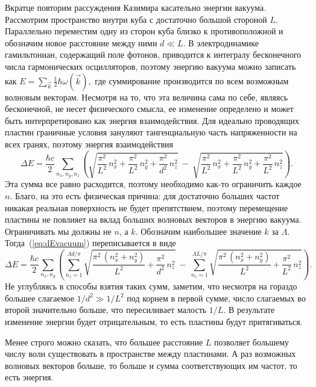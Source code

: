 Вкратце повторим рассуждения Казимира касательно энергии вакуума. Рассмотрим пространство внутри куба с достаточно большой стороной $L$. Параллельно переместим одну из сторон куба близко к противоположной и обозначим новое расстояние между ними $d\ll L$. 
В электродинамике гамильтониан, содержащий поле фотонов, приводится к интегралу бесконечного числа гармонических осцилляторов, поэтому энергию вакуума можно записать как 
$E = \sum\limits_\vec{k} \frac{1}{2} \hbar\omega(\vec{k}),$
где суммирование производится по всем возможным волновым векторам. Несмотря на то, что эта величина сама по себе, являясь бесконечной, не несет физического смысла, ее изменение определено и может быть интерпретировано как энергия взаимодействия. Для идеально проводящих пластин граничные условия зануляют тангенциальную часть напряженности на всех гранях, поэтому энергия взаимодействия
\begin{equation}
\Delta E = \frac{\hbar c}{2}\sum\limits_{n_x, n_y, n_z} \left(
\sqrt{\frac{\pi^2}{L^2}\,n_x^2 + \frac{\pi^2}{L^2}\,n_y^2 + \frac{\pi^2}{d^2}\,n_z^2} \ - \ 
\sqrt{\frac{\pi^2}{L^2}\,n_x^2 + \frac{\pi^2}{L^2}\,n_y^2 + \frac{\pi^2}{L^2}\,n_z^2}
\right).
\label{eq:dEvacuum}
\end{equation}
Эта сумма все равно расходится, поэтому необходимо как-то ограничить каждое~$n$. Благо, на это есть физическая причина: для достаточно больших частот никакая реальная поверхность не будет препятствием, поэтому перемещение пластины не повлияет на вклад больших волновых векторов в энергию вакуума. Ограничивать мы должны не $n$, а $k$. Обозначим наибольшее значение $k$ за $\Lambda$. Тогда~(\ref{eq:dEvacuum}) переписывается в виде 
\begin{equation}
\Delta E = \frac{\hbar c}{2}\sum\limits_{n_x, n_y}\left(
\sum\limits_{n_z=1}^{\Lambda d/\pi} \sqrt{\frac{\pi^2\,(n_x^2 + n_y^2)}{L^2} + \frac{\pi^2}{d^2}\,n_z^2} \ - \ 
\sum\limits_{n_z=1}^{\Lambda L/\pi} \sqrt{\frac{\pi^2\,(n_x^2 + n_y^2)}{L^2} + \frac{\pi^2}{L^2}\,n_z^2}
\right).
\label{eq:dEvac.trimmed}
\end{equation}
Не углубляясь в способы взятия таких сумм, заметим, что несмотря на гораздо большее слагаемое $1/d^2 \gg 1/L^2$ под корнем в первой сумме, число слагаемых во второй значительно больше, что пересиливает малость $1/L$. В результате изменение энергии будет отрицательным, то есть пластины будут притягиваться. 

Менее строго можно сказать, что большее расстояние $L$ позволяет большему числу волн существовать в пространстве между пластинами. А раз возможных волновых векторов больше, то больше и сумма соответствующих им частот, то есть энергия. 

